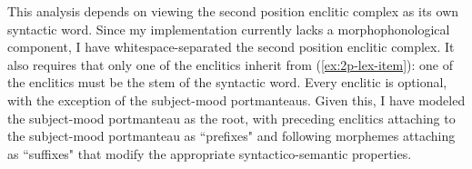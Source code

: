 \begin{comment}
My analysis for this is the same as that for focus fronting, minus the addition of focused information. I create a similar rule that behaves in the same way, \textit{non-focus-filler-head-rule}. Where the \textit{focus-filler-head-rule} adds focus information to its non-head-daughter, the \textit{non-focus-filler-head-rule} does not, and requires that its non-head-daughter be [\textsc{head} \textit{quantifier}]. Similarly, I add the constraint to \textit{focus-filler-head-rule} that its non-head-daughter be [\textsc{head} \textit{non-quantifier}].

I assert that the clitics are the syntactic heads of the clause. This analysis requires argument composition, or a word (in this case, the syntactic word of the second position enclitic complex) taking on the arguments of its complement (here, the sentential predicate), an analysis first developed in \cite{millersag1997}. The way I model this in my implementation is by the subject-mood clitics taking their complement's valence properties and making it their own. That is, the generic type for the second-position clitics is:

\ex \label{ex:2pavm}
\begin{avm}
\[\asort{clausal-inflection}
  \textsc{head.pred} & + \\
  \textsc{subj} & \avmbox{1} \\
  \textsc{comp} & \< \[\textsc{head.pred} & $+$ \\
                       \textsc{subj} & \avmbox{1} \\
                       \textsc{comp} & \avmbox{2} \] \>\ $\oplus$ \avmbox{2}
 \]
\end{avm}
\xe

\end{comment}


This analysis depends on viewing the second position enclitic complex as its own syntactic word. Since my implementation currently lacks a morphophonological component, I have whitespace-separated the second position enclitic complex. It also requires that only one of the enclitics inherit from (\ref{ex:2p-lex-item}): one of the enclitics must be the stem of the syntactic word. Every enclitic is optional, with the exception of the subject-mood portmanteaus. Given this, I have modeled the subject-mood portmanteau as the root, with preceding enclitics attaching to the subject-mood portmanteau as ``prefixes" and following morphemes attaching as ``suffixes" that modify the appropriate syntactico-semantic properties.

